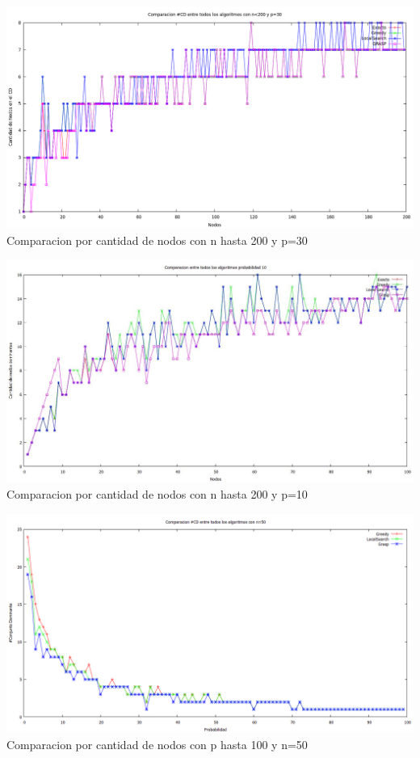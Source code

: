 
\begin{center}
\includegraphics[width=17cm]{./graficos/comparacioncantCDnvariablep30.png}\\
Comparacion por cantidad de nodos con n hasta 200 y p=30
\end{center}


\begin{center}
\includegraphics[width=17cm]{./graficos/todos_nodos.jpg}\\
Comparacion por cantidad de nodos con n hasta 200 y p=10
\end{center}


\begin{center}
\includegraphics[width=17cm]{./graficos/comparacioncantCDprobvariablen50.png}\\
Comparacion por cantidad de nodos con p hasta 100 y n=50
\end{center}


